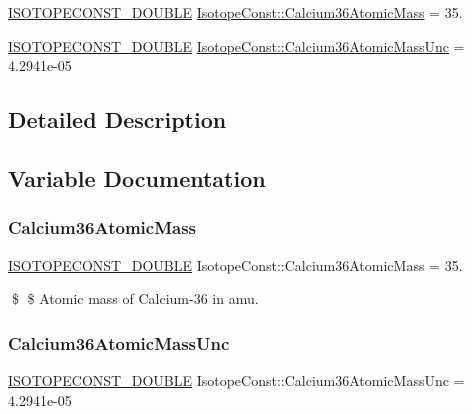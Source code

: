 \begin{DoxyCompactItemize}
\item 
\mbox{\hyperlink{group___isotope_const-_macros_ga8f45a7272ce02c0b4c65c44636ed719a}{I\+S\+O\+T\+O\+P\+E\+C\+O\+N\+S\+T\+\_\+\+D\+O\+U\+B\+LE}} \mbox{\hyperlink{group___isotope_const-_calcium-_ca36_ga7ff2f96dc2f0e883ea3dabf6115805b5}{Isotope\+Const\+::\+Calcium36\+Atomic\+Mass}} = 35.
\item 
\mbox{\hyperlink{group___isotope_const-_macros_ga8f45a7272ce02c0b4c65c44636ed719a}{I\+S\+O\+T\+O\+P\+E\+C\+O\+N\+S\+T\+\_\+\+D\+O\+U\+B\+LE}} \mbox{\hyperlink{group___isotope_const-_calcium-_ca36_ga0f7d5daee9f7be8806109d9cf550853a}{Isotope\+Const\+::\+Calcium36\+Atomic\+Mass\+Unc}} = 4.\+2941e-\/05
\end{DoxyCompactItemize}


\subsection{Detailed Description}


\subsection{Variable Documentation}
\mbox{\label{group___isotope_const-_calcium-_ca36_ga7ff2f96dc2f0e883ea3dabf6115805b5}} 
\subsubsection{\texorpdfstring{Calcium36\+Atomic\+Mass}{Calcium36AtomicMass}}
{\footnotesize\ttfamily \mbox{\hyperlink{group___isotope_const-_macros_ga8f45a7272ce02c0b4c65c44636ed719a}{I\+S\+O\+T\+O\+P\+E\+C\+O\+N\+S\+T\+\_\+\+D\+O\+U\+B\+LE}} Isotope\+Const\+::\+Calcium36\+Atomic\+Mass = 35.}

\$ \$ Atomic mass of Calcium-\/36 in amu. \mbox{\label{group___isotope_const-_calcium-_ca36_ga0f7d5daee9f7be8806109d9cf550853a}} 
\subsubsection{\texorpdfstring{Calcium36\+Atomic\+Mass\+Unc}{Calcium36AtomicMassUnc}}
{\footnotesize\ttfamily \mbox{\hyperlink{group___isotope_const-_macros_ga8f45a7272ce02c0b4c65c44636ed719a}{I\+S\+O\+T\+O\+P\+E\+C\+O\+N\+S\+T\+\_\+\+D\+O\+U\+B\+LE}} Isotope\+Const\+::\+Calcium36\+Atomic\+Mass\+Unc = 4.\+2941e-\/05}

